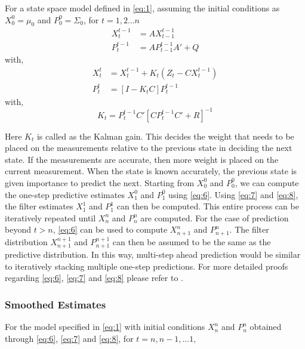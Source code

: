\documentclass{article}
\begin{document}
For a state space model defined in \ref{eq:1}, assuming the initial conditions as $X_0^0=\mu_0$ and $P_0^0=\Sigma_0$, for $t=1,2...n$
\begin{equation} \label{eq:6}
    \begin{split}
        X_t^{t-1} &= AX_{t-1}^{t-1}\\
        P_t^{t-1} &= AP_{t-1}^{t-1}A' + Q
    \end{split}
\end{equation}
with, 
\begin{equation}\label{eq:7}
    \begin{split}
        X_t^{t} &= X_t^{t-1} + K_t(Z_t-CX_t^{t-1})\\
        P_t^{t} &= [I-K_tC]P_t^{t-1}
    \end{split}
\end{equation}
with, 
\begin{equation}\label{eq:8}
    K_t = P_t^{t-1}C'[CP_t^{t-1}C' + R]^{-1}
\end{equation}

Here $K_t$ is called as the Kalman gain. This decides the weight that needs to be placed on the measurements relative to the previous state in deciding the next state. If the measurements are accurate, then more weight is placed on the current measurement. When the state is known accurately, the previous state is given importance to predict the next.  Starting from $X_{0}^0$ and $P_0^0$, we can compute the one-step predictive estimates $X_{1}^0$ and $P_{1}^0$ using \ref{eq:6}. Using \ref{eq:7} and \ref{eq:8}, the filter estimates $X_{1}^1$ and $P_{1}^1$ can then be computed. This entire process can be iteratively repeated until $X_{n}^n$ and $P_{n}^n$ are computed. For the case of prediction beyond $t>n$, \ref{eq:6} can be used to compute $X_{n+1}^n$ and $P_{n+1}^n$. The filter distribution $X_{n+1}^{n+1}$ and $P_{n+1}^{n+1}$  can then be assumed to be the same as the predictive distribution. In this way, multi-step ahead prediction would be similar to iteratively stacking multiple one-step predictions. For more detailed proofs regarding \ref{eq:6}, \ref{eq:7} and \ref{eq:8} please refer to \cite{shumstof2000}.

\subsubsection{Smoothed Estimates}\label{ssec:smoothing}
For the model specified in \ref{eq:1} with initial conditions $X_n^n$ and $P_n^n$ obtained through \ref{eq:6}, \ref{eq:7} and \ref{eq:8}, for $t = n,n-1,...1,$ 
\end{document}
